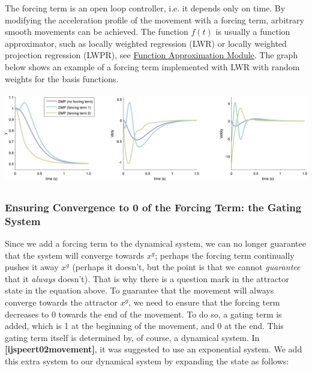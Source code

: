 The forcing term is an open loop controller, i.\+e. it depends only on time. By modifying the acceleration profile of the movement with a forcing term, arbitrary smooth movements can be achieved. The function $ f(t)$ is usually a function approximator, such as locally weighted regression (L\+W\+R) or locally weighted projection regression (L\+W\+P\+R), see \hyperlink{page_func_approx}{Function Approximation Module}. The graph below shows an example of a forcing term implemented with L\+W\+R with random weights for the basis functions.


\begin{DoxyImage}
\includegraphics[height=4cm]{dmp_forcing_terms-svg}
\caption{A non-\/linear forcing term enable more complex trajectories to be generated (these D\+M\+Ps use a goal system and an exponential gating term).}
\end{DoxyImage}
\hypertarget{page_dmp_sec_forcing_convergence}{}\subsubsection{Ensuring Convergence to 0 of the Forcing Term\+: the Gating System}\label{page_dmp_sec_forcing_convergence}
Since we add a forcing term to the dynamical system, we can no longer guarantee that the system will converge towards $ x^g $; perhaps the forcing term continually pushes it away $ x^g $ (perhaps it doesn't, but the point is that we cannot {\itshape guarantee} that it {\itshape always} doesn't). That is why there is a question mark in the attractor state in the equation above. To guarantee that the movement will always converge towards the attractor $ x^g $, we need to ensure that the forcing term decreases to 0 towards the end of the movement. To do so, a gating term is added, which is 1 at the beginning of the movement, and 0 at the end. This gating term itself is determined by, of course, a dynamical system. In {\bfseries [ijspeert02movement]}, it was suggested to use an exponential system. We add this extra system to our dynamical system by expanding the state as follows\+:


